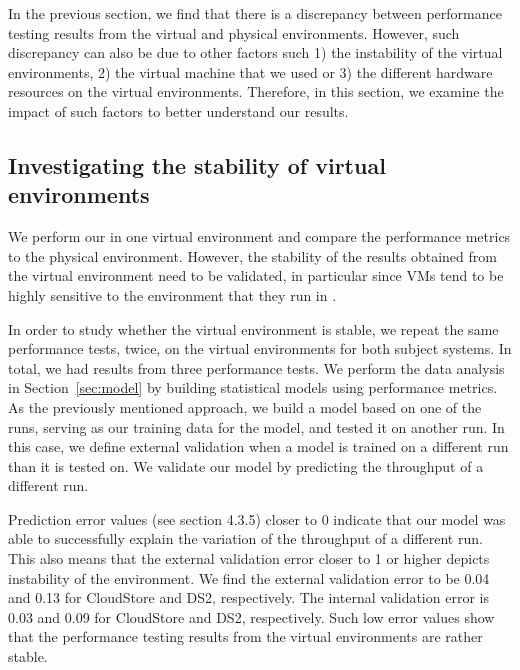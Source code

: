 
In the previous section, we find that there is a discrepancy between performance testing results from the virtual and physical environments. However, such discrepancy can also be due to other factors such 1) the instability of the virtual environments, 2) the virtual machine that we used or 3) the different hardware resources on the virtual environments. Therefore, in this section, we examine the impact of such factors to better understand our results. 


\subsection{Investigating the stability of virtual environments}

We perform our in one virtual environment and compare the performance metrics to the physical environment. However, the stability of the results obtained from the virtual environment need to be validated, in particular since VMs tend to be highly sensitive to the environment that they run in \cite{leitner}.


In order to study whether the virtual environment is stable, we repeat the same performance tests, twice, on the virtual environments for both subject systems. In total, we had results from three performance tests. We perform the data analysis in Section~\ref{sec:model} by building statistical models using performance metrics. %
As the previously mentioned approach, we build a model based on one of the runs, serving as our training data for the model, and tested it on another run. In this case, we define external validation when a model is trained on a different run than it is tested on. We validate our model by predicting the throughput of a different run.  
 
Prediction error values (see section 4.3.5) closer to 0 indicate that our model was able to successfully explain the variation of the throughput of a different run. This also means that the external validation error closer to 1 or higher depicts instability of the environment. We find the external validation error to be 0.04 and 0.13 for CloudStore and DS2, respectively. The internal validation error is 0.03 and 0.09 for CloudStore and DS2, respectively. Such low error values show that the performance testing results from the virtual environments are rather stable. 

